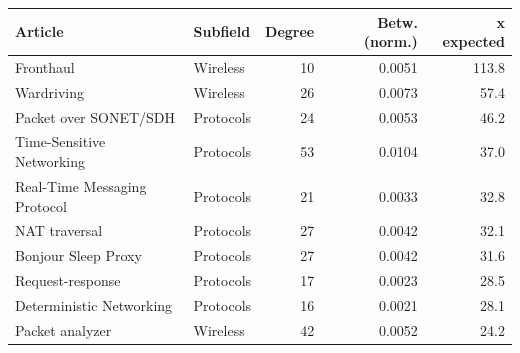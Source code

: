 
\begin{tabular}{llrrr}
\toprule
Article & Subfield & Degree & Betw. (norm.) & x expected\\
\midrule
Fronthaul & Wireless & 10 & 0.0051 & 113.8\\
Wardriving & Wireless & 26 & 0.0073 & 57.4\\
Packet over SONET/SDH & Protocols & 24 & 0.0053 & 46.2\\
Time-Sensitive Networking & Protocols & 53 & 0.0104 & 37.0\\
Real-Time Messaging Protocol & Protocols & 21 & 0.0033 & 32.8\\
NAT traversal & Protocols & 27 & 0.0042 & 32.1\\
Bonjour Sleep Proxy & Protocols & 27 & 0.0042 & 31.6\\
Request-response & Protocols & 17 & 0.0023 & 28.5\\
Deterministic Networking & Protocols & 16 & 0.0021 & 28.1\\
Packet analyzer & Wireless & 42 & 0.0052 & 24.2\\
\bottomrule
\end{tabular}
